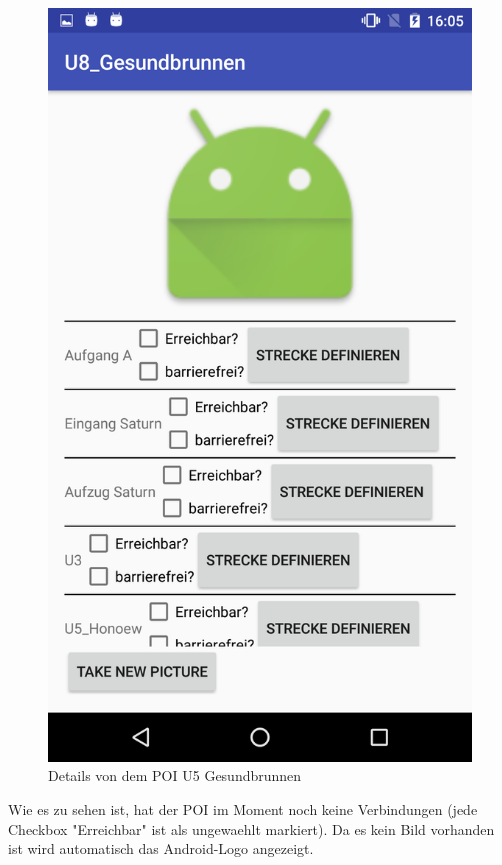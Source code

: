 \documentclass{article}
\begin{document}
\begin{figure}[H]
	\centering
	\includegraphics[scale=0.18]{images/poi_gesundbrunnen_details_empty.png}
	\caption{Details von dem POI U5 Gesundbrunnen}
	\label{fig:poi_gesundbrunnen_details_empty}
\end{figure}

Wie es zu sehen ist, hat der POI im Moment noch keine Verbindungen (jede Checkbox "Erreichbar" ist als ungewaehlt markiert).
Da es kein Bild vorhanden ist wird automatisch das Android-Logo angezeigt.
\end{document}
